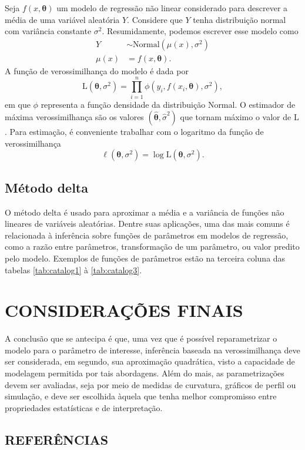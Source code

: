 Seja $f(x, \boldsymbol{\theta})$ um modelo de regressão não linear
considerado para descrever a média de uma variável aleatória $Y$.
Considere que $Y$ tenha distribuição normal com variância constante
$\sigma^2$. Resumidamente, podemos escrever esse modelo como
\begin{align*}
 Y &\sim \text{Normal}(\mu(x), \sigma^2)\\
 \mu(x) &=  f(x,\boldsymbol{\theta}).
\end{align*}
A função de verossimilhança do modelo é dada por
\begin{equation}
 \text{L}(\boldsymbol{\theta}, \sigma^2) =
 \prod_{i=1}^{n} \phi(y_i, f(x_i, \boldsymbol\theta), \sigma^2),
\end{equation}
em que $\phi$ representa a função densidade da distribuição Normal. O
estimador de máxima verossimilhança são os valores
$(\hat{\boldsymbol\theta}, \hat\sigma^2)$ que tornam máximo o valor de
$\text{L}$. Para estimação, é conveniente trabalhar com o logaritmo da
função de verossimilhança
\begin{equation}
 \ell(\boldsymbol{\theta}, \sigma^2) =
 \log \text{L}(\boldsymbol{\theta}, \sigma^2).
\end{equation}

\subsection{Método delta}

O método delta é usado para aproximar a média e a variância de funções
não lineares de variáveis aleatórias. Dentre suas aplicações, uma das
mais comuns é relacionada à inferência sobre funções de parâmetros em
modelos de regressão, como a razão entre parâmetros, transformação de
um parâmetro, ou valor predito pelo modelo. Exemplos de funções de
parâmetros estão na terceira coluna das tabelas \ref{tab:catalog1} à
\ref{tab:catalog3}.

\newpage
\section{CONSIDERAÇÕES FINAIS}

A conclusão que se antecipa é que, uma vez que é possível
reparametrizar o modelo para o parâmetro de interesse, inferência
baseada na verossimilhança deve ser considerada, em segundo, sua
aproximação quadrática, visto a capacidade de modelagem permitida por
tais abordagens. Além do mais, as parametrizações devem ser avaliadas,
seja por meio de medidas de curvatura, gráficos de perfil ou
simulação, e deve ser escolhida àquela que tenha melhor compromisso
entre propriedades estatísticas e de interpretação.

\newpage
{}
\begin{center}
\section*{REFERÊNCIAS} 
\end{center}
